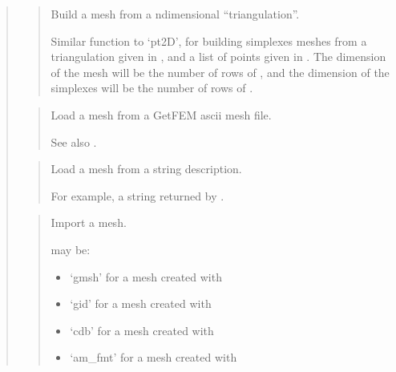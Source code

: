 \documentclass[a4paper,11pt,english]{sphinxmanual}
\begin{document}
\begin{quote}
\begin{quote}

Build a mesh from a n\sphinxhyphen{}dimensional “triangulation”.

Similar function to ‘pt2D’, for building simplexes meshes from a
triangulation given in , and a list of points given in . The
dimension of the mesh will be the number of rows of , and the
dimension of the simplexes will be the number of rows of .
\end{quote}

\begin{quote}

Load a mesh from a GetFEM ascii mesh file.

See also .
\end{quote}

\begin{quote}

Load a mesh from a string description.

For example, a string returned by .
\end{quote}

\begin{quote}

Import a mesh.

 may be:
\begin{itemize}
\item {} 
‘gmsh’ for a mesh created with 

\item {} 
‘gid’ for a mesh created with 

\item {} 
‘cdb’ for a mesh created with 

\item {} 
‘am\_fmt’ for a mesh created with 


\end{itemize}
\end{quote}
\end{quote}
\end{document}
